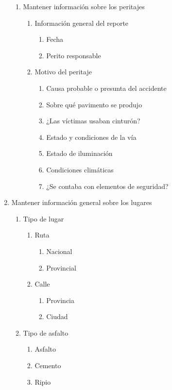 \begin{enumerate}
\begin{enumerate}
			\item Mantener información sobre los peritajes
				\begin{enumerate}
					\item Información general del reporte
						\begin{enumerate}
							\item Fecha
							\item Perito responsable
						\end{enumerate}
					\item Motivo del peritaje
						\begin{enumerate}
							\item Causa probable o presunta del accidente
							\item Sobre qué pavimento se produjo
							\item ¿Las víctimas usaban cinturón?
							\item Estado y condiciones de la vía
							\item Estado de iluminación
							\item Condiciones climáticas
							\item ¿Se contaba con elementos de seguridad?
						\end{enumerate}
				\end{enumerate}
		\end{enumerate}
	\item{Mantener información general sobre los lugares}
		\begin{enumerate}
			\item Tipo de lugar
				\begin{enumerate}
					\item Ruta
						\begin{enumerate}
							\item Nacional
							\item Provincial
						\end{enumerate}
					\item Calle
						\begin{enumerate}
							\item Provincia
							\item Ciudad
						\end{enumerate}
				\end{enumerate}	
			\item Tipo de asfalto
				\begin{enumerate}
					\item Asfalto
					\item Cemento
					\item Ripio

\end{enumerate}
\end{enumerate}
\end{enumerate}

